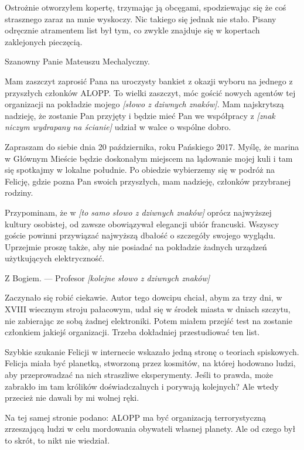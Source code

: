 Ostrożnie otworzyłem kopertę, trzymając ją obcęgami, spodziewając się że coś strasznego zaraz na mnie wyskoczy.
Nic takiego się jednak nie stało.
Pisany odręcznie atramentem list był tym, co zwykle znajduje się w kopertach zaklejonych pieczęcią.

\begin{em}
Szanowny Panie Mateuszu Mechalyczny.

Mam zaszczyt zaprosić Pana na uroczysty bankiet z okazji wyboru na jednego z przyszłych członków ALOPP.
To wielki zaszczyt, móc gościć nowych agentów tej organizacji na pokładzie mojego \emph{[słowo z dziwnych znaków]}.
Mam najskrytszą nadzieję, że zostanie Pan przyjęty i będzie mieć Pan we współpracy z \emph{[znak niczym wydrapany na ścianie]} udział w walce o wspólne dobro.

Zapraszam do siebie dnia 20 października, roku Pańskiego 2017.
Myślę, że marina w Głównym Mieście będzie doskonałym miejscem na lądowanie mojej kuli i tam się spotkajmy w lokalne południe.
Po obiedzie wybierzemy się w podróż na Felicję, gdzie pozna Pan swoich przyszłych, mam nadzieję, członków przybranej rodziny.

Przypominam, że w \emph{[to samo słowo z dziwnych znaków]} oprócz najwyższej kultury osobistej,
od zawsze obowiązywał elegancji ubiór francuski.
Wszyscy goście powinni przywiązać najwyższą dbałość o szczegóły swojego wyglądu.
Uprzejmie proszę także, aby nie posiadać na pokładzie żadnych urządzeń użytkujących elektryczność.

Z Bogiem.
--- Profesor \emph{[kolejne słowo z dziwnych znaków]}
\end{em}

Zaczynało się robić ciekawie. Autor tego dowcipu chciał, abym za trzy dni, w XVIII wiecznym stroju pałacowym,
udał się w środek miasta w dniach szczytu, nie zabierając ze sobą żadnej elektroniki.
Potem miałem przejść test na zostanie członkiem jakiejś organizacji.
Trzeba dokładniej przestudiować ten list.

Szybkie szukanie Felicji w internecie wskazało jedną stronę o teoriach spiskowych.
Felicja miała być planetką, stworzoną przez kosmitów, na której hodowano ludzi, aby przeprowadzać na nich straszliwe eksperymenty.
Jeśli to prawda, może zabrakło im tam królików doświadczalnych i porywają kolejnych? 
Ale wtedy przecież nie dawali by mi wolnej ręki.

Na tej samej stronie podano: ALOPP ma być organizacją terrorystyczną zrzeszającą ludzi w celu mordowania obywateli własnej planety.
Ale od czego był to skrót, to nikt nie wiedział.

